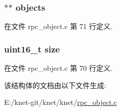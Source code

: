 \subsubsection[{objects}]{$\ast$$\ast$ objects}\label{struct__krpc__vector__t_a2144b4060fd489bace28fc4ce06e1aaf}


在文件 rpc\+\_\+object.\+c 第 71 行定义.

\hypertarget{struct__krpc__vector__t_aaba88b24a21a6c70c895c0d55f4a69a0}{}
\subsubsection[{size}]{\setlength{\rightskip}{0pt plus 5cm}uint16\+\_\+t size}\label{struct__krpc__vector__t_aaba88b24a21a6c70c895c0d55f4a69a0}


在文件 rpc\+\_\+object.\+c 第 70 行定义.



该结构体的文档由以下文件生成\+:\begin{DoxyCompactItemize}
\item 
E\+:/knet-\/git/knet/knet/\hyperlink{rpc__object_8c}{rpc\+\_\+object.\+c}\end{DoxyCompactItemize}
